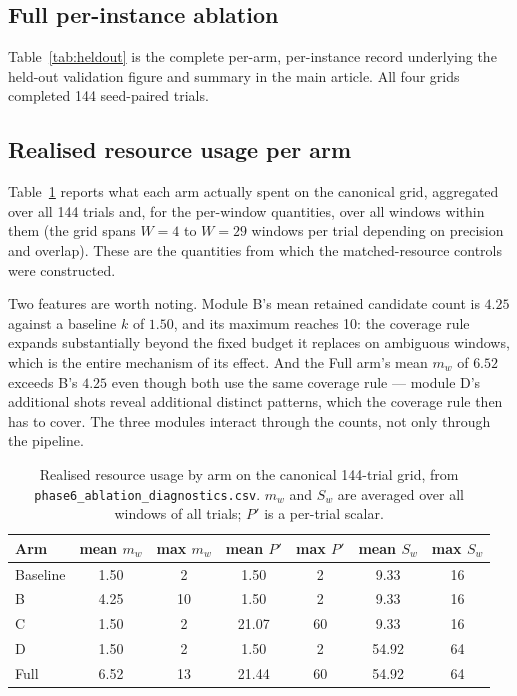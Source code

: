 \documentclass[preprint,11pt]{elsarticle}
\begin{document}
\subsection{Full per-instance ablation}

Table~\ref{tab:heldout} is the complete per-arm, per-instance record
underlying the held-out validation figure and summary in the main
article. All four grids completed 144 seed-paired trials.



\subsection{Realised resource usage per arm}

Table~\ref{tab:secondary} reports what each arm actually spent on the
canonical grid, aggregated over all 144 trials and, for the per-window
quantities, over all windows within them (the grid spans $W=4$ to $W=29$
windows per trial depending on precision and overlap). These are the
quantities from which the matched-resource controls were constructed.

Two features are worth noting. Module B's mean retained candidate count
is $4.25$ against a baseline $k$ of $1.50$, and its maximum reaches 10:
the coverage rule expands substantially beyond the fixed budget it
replaces on ambiguous windows, which is the entire mechanism of its
effect. And the Full arm's mean $m_w$ of $6.52$ exceeds B's $4.25$ even
though both use the same coverage rule --- module D's additional shots
reveal additional distinct patterns, which the coverage rule then has to
cover. The three modules interact through the counts, not only through
the pipeline.

\begin{table}[h]
\centering\small
\caption{Realised resource usage by arm on the canonical 144-trial grid,
from \texttt{phase6\_ablation\_diagnostics.csv}. $m_w$ and $S_w$ are
averaged over all windows of all trials; $P'$ is a per-trial scalar.}
\label{tab:secondary}
\begin{tabular}{@{}lcccccc@{}}
\toprule
Arm & mean $m_w$ & max $m_w$ & mean $P'$ & max $P'$ & mean $S_w$ & max $S_w$ \\
\midrule
Baseline & 1.50 & 2  & 1.50  & 2  & 9.33  & 16 \\
B        & 4.25 & 10 & 1.50  & 2  & 9.33  & 16 \\
C        & 1.50 & 2  & 21.07 & 60 & 9.33  & 16 \\
D        & 1.50 & 2  & 1.50  & 2  & 54.92 & 64 \\
Full     & 6.52 & 13 & 21.44 & 60 & 54.92 & 64 \\
\bottomrule
\end{tabular}
\end{table}
\end{document}

